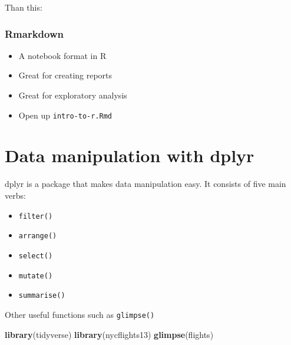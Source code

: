 \documentclass[]{book}
\newenvironment{Shaded}{\begin{snugshade}}{\end{snugshade}}
\newcommand{\DataTypeTok}[1]{\textcolor[rgb]{0.13,0.29,0.53}{#1}}
\newcommand{\KeywordTok}[1]{\textcolor[rgb]{0.13,0.29,0.53}{\textbf{#1}}}
\newcommand{\NormalTok}[1]{#1}
\newcommand{\OperatorTok}[1]{\textcolor[rgb]{0.81,0.36,0.00}{\textbf{#1}}}
\newcommand{\StringTok}[1]{\textcolor[rgb]{0.31,0.60,0.02}{#1}}
\begin{document}
Than this:

\begin{Shaded}
\end{Shaded}

\hypertarget{rmarkdown}{%
\subsection{Rmarkdown}\label{rmarkdown}}

\begin{itemize}
\item
  A notebook format in R
\item
  Great for creating reports
\item
  Great for exploratory analysis
\item
  Open up \texttt{intro-to-r.Rmd}
\end{itemize}

\hypertarget{data-manipulation-with-dplyr}{%
\chapter{Data manipulation with dplyr}\label{data-manipulation-with-dplyr}}

dplyr is a package that makes data manipulation easy. It consists of five main verbs:

\begin{itemize}
\item
  \texttt{filter()}
\item
  \texttt{arrange()}
\item
  \texttt{select()}
\item
  \texttt{mutate()}
\item
  \texttt{summarise()}
\end{itemize}

Other useful functions such as \texttt{glimpse()}

\begin{Shaded}
\begin{Highlighting}[]
\KeywordTok{library}\NormalTok{(tidyverse)}
\KeywordTok{library}\NormalTok{(nycflights13)}
\KeywordTok{glimpse}\NormalTok{(flights)}
\end{Highlighting}
\end{Shaded}
\end{document}
